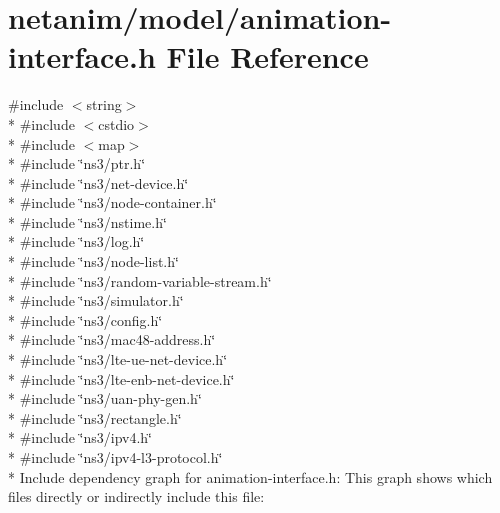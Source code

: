 \hypertarget{animation-interface_8h}{}\section{netanim/model/animation-\/interface.h File Reference}
\label{animation-interface_8h}
{\ttfamily \#include $<$string$>$}\\*
{\ttfamily \#include $<$cstdio$>$}\\*
{\ttfamily \#include $<$map$>$}\\*
{\ttfamily \#include \char`\"{}ns3/ptr.\+h\char`\"{}}\\*
{\ttfamily \#include \char`\"{}ns3/net-\/device.\+h\char`\"{}}\\*
{\ttfamily \#include \char`\"{}ns3/node-\/container.\+h\char`\"{}}\\*
{\ttfamily \#include \char`\"{}ns3/nstime.\+h\char`\"{}}\\*
{\ttfamily \#include \char`\"{}ns3/log.\+h\char`\"{}}\\*
{\ttfamily \#include \char`\"{}ns3/node-\/list.\+h\char`\"{}}\\*
{\ttfamily \#include \char`\"{}ns3/random-\/variable-\/stream.\+h\char`\"{}}\\*
{\ttfamily \#include \char`\"{}ns3/simulator.\+h\char`\"{}}\\*
{\ttfamily \#include \char`\"{}ns3/config.\+h\char`\"{}}\\*
{\ttfamily \#include \char`\"{}ns3/mac48-\/address.\+h\char`\"{}}\\*
{\ttfamily \#include \char`\"{}ns3/lte-\/ue-\/net-\/device.\+h\char`\"{}}\\*
{\ttfamily \#include \char`\"{}ns3/lte-\/enb-\/net-\/device.\+h\char`\"{}}\\*
{\ttfamily \#include \char`\"{}ns3/uan-\/phy-\/gen.\+h\char`\"{}}\\*
{\ttfamily \#include \char`\"{}ns3/rectangle.\+h\char`\"{}}\\*
{\ttfamily \#include \char`\"{}ns3/ipv4.\+h\char`\"{}}\\*
{\ttfamily \#include \char`\"{}ns3/ipv4-\/l3-\/protocol.\+h\char`\"{}}\\*
Include dependency graph for animation-\/interface.h\+:
This graph shows which files directly or indirectly include this file\+:
